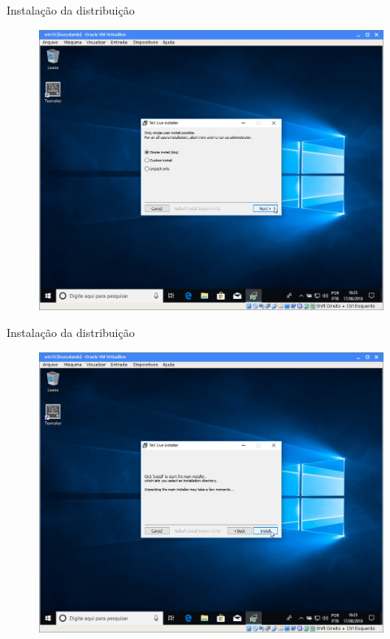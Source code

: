 \documentclass{beamer}
\begin{document}
\begin{frame}{Instala\c{c}\~ao da distribui\c{c}\~ao}
    \begin{figure}[h]
        \includegraphics[scale=0.25]{fig/texlive-01.png}
    \end{figure}
\end{frame}

\begin{frame}{Instala\c{c}\~ao da distribui\c{c}\~ao}
    \begin{figure}[h]
        \includegraphics[scale=0.25]{fig/texlive-02.png}
    \end{figure}
\end{frame}
\end{document}
